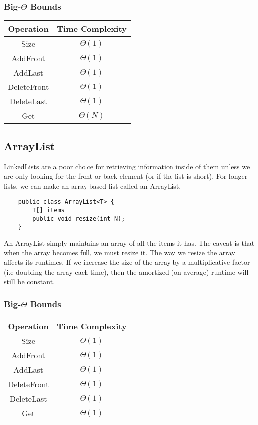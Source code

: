 \documentclass{article}
\begin{document}
\subsubsection{Big-$\Theta$ Bounds}
\begin{center}
    \begin{tabular}{ c | c }
     Operation & Time Complexity\\
     \hline
     Size & $\Theta(1)$\\ 
     AddFront & $\Theta(1)$\\  
     AddLast & $\Theta(1)$\\
     DeleteFront & $\Theta(1)$\\
     DeleteLast & $\Theta(1)$\\
     Get & $\Theta(N)$
    \end{tabular}
\end{center}
\subsection{ArrayList}
LinkedLists are a poor choice for retrieving information inside of them unless we are only looking for the front or back element (or if the list is short).
For longer lists, we can make an array-based list called an ArrayList.
\begin{lstlisting}
    public class ArrayList<T> {
        T[] items
        public void resize(int N);
    }
\end{lstlisting}
An ArrayList simply maintains an array of all the items it has. The caveat is that when the array becomes full, we must resize it.
The way we resize the array affects its runtimes. If we increase the size of the array by a multiplicative factor (i.e doubling the array each time),
then the amortized (on average) runtime will still be constant.
\subsubsection{Big-$\Theta$ Bounds}
\begin{center}
    \begin{tabular}{ c | c }
     Operation & Time Complexity\\
     \hline
     Size & $\Theta(1)$\\ 
     AddFront & $\Theta(1)$\\  
     AddLast & $\Theta(1)$\\
     DeleteFront & $\Theta(1)$\\
     DeleteLast & $\Theta(1)$\\
     Get & $\Theta(1)$
    \end{tabular}
\end{center}
\end{document}
